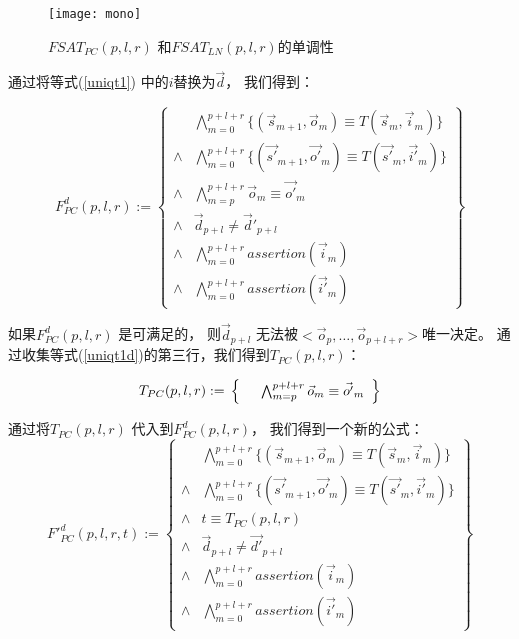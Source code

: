 \begin{figure}[t]
\begin{center}
\texttt{[image: mono]}
\end{center}
\caption{$FSAT_{PC}(p,l,r)$ 和$FSAT_{LN}(p,l,r)$的单调性}
  \label{fig_mono}
\end{figure}

通过将等式(\ref{uniqt1}) 中的$i$替换为$\vec{d}$，
我们得到：

\begin{equation}\label{uniqt1d}
F^d_{PC}(p,l,r):=
\left\{
\begin{array}{cc}
&\bigwedge_{m=0}^{p+l+r}
\{
(\vec{s}_{m+1},\vec{o}_m)\equiv T(\vec{s}_m,\vec{i}_m)
\}
\\
\wedge&\bigwedge_{m=0}^{p+l+r}
\{
(\vec{s'}_{m+1},\vec{o'}_m)\equiv T(\vec{s'}_m,\vec{i'}_m)
\}
\\
\wedge&\bigwedge_{m=p}^{p+l+r}\vec{o}_m\equiv \vec{o'}_m \\
\wedge& \vec{d}_{p+l}\ne \vec{d}'_{p+l} \\
\wedge&\bigwedge_{m=0}^{p+l+r}assertion(\vec{i}_m) \\
\wedge&\bigwedge_{m=0}^{p+l+r}assertion(\vec{i'}_m)
\end{array}
\right\}
\end{equation}

如果$F^d_{PC}(p,l,r)$ 是可满足的，
则$\vec{d}_{p+l}$ 无法被$<\vec{o}_p,\dots,\vec{o}_{p+l+r}>$唯一决定。
通过收集等式(\ref{uniqt1d})的第三行，我们得到$T_{PC}(p,l,r)$：

\begin{equation}\label{tpc}
T_{PC}(p,l,r):=\\
\left\{
\begin{array}{cc}
      &\bigwedge_{m=p}^{p+l+r}\vec{o}_m\equiv \vec{o'}_m \\
\end{array}
\right\}
\end{equation}

通过将$T_{PC}(p,l,r)$ 代入到$F^d_{PC}(p,l,r)$，
我们得到一个新的公式：
\begin{equation}\label{fpcq}
F'^d_{PC}(p,l,r,t):=
\left\{
\begin{array}{cc}
&\bigwedge_{m=0}^{p+l+r}
\{
(\vec{s}_{m+1},\vec{o}_m)\equiv T(\vec{s}_m,\vec{i}_m)
\}
\\
\wedge&\bigwedge_{m=0}^{p+l+r}
\{
(\vec{s'}_{m+1},\vec{o'}_m)\equiv T(\vec{s'}_m,\vec{i'}_m)
\}
\\
\wedge& t\equiv T_{PC}(p,l,r)\\
\wedge& \vec{d}_{p+l}\ne \vec{d'}_{p+l} \\
\wedge&\bigwedge_{m=0}^{p+l+r}assertion(\vec{i}_m) \\
\wedge&\bigwedge_{m=0}^{p+l+r}assertion(\vec{i'}_m)
\end{array}
\right\}
\end{equation}



